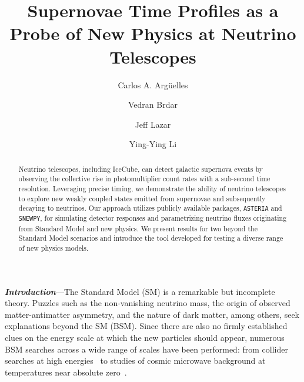 \documentclass[aps,twocolumn,prl,showpacs,showkeys,preprintnumbers,superscriptaddress,nobibnotes,floatfix,longbibliography,notitlepage,nofootinbib]{revtex4-2}
\begin{document}

\title{
Supernovae Time Profiles as a Probe of New Physics at Neutrino Telescopes
}

\author{Carlos A. Arg\"{u}elles}
\author{Vedran Brdar}
\author{Jeff Lazar}
\author{Ying-Ying Li}


\begin{abstract}
Neutrino telescopes, including IceCube, can detect galactic supernova events by observing the collective rise in photomultiplier count rates with a sub-second time resolution. 
Leveraging precise timing, we demonstrate the ability of neutrino telescopes to explore new weakly coupled states emitted from supernovae and subsequently decaying to neutrinos.
Our approach utilizes publicly available packages, \texttt{ASTERIA} and \texttt{SNEWPY}, for simulating detector responses and parametrizing neutrino fluxes originating from Standard Model and new physics. 
We present results for two beyond the Standard Model scenarios and introduce the tool developed for testing a diverse range of new physics models.
\end{abstract}

\maketitle

\textbf{\textit{Introduction}}---The Standard Model (SM) is a remarkable but incomplete theory. 
Puzzles such as the non-vanishing neutrino mass, the origin of observed matter-antimatter asymmetry, and the nature of dark matter, among others, seek explanations beyond the SM (BSM).
Since there are also no firmly established clues on the energy scale at which the new particles should appear, numerous BSM searches across a wide range of scales have been performed: from collider searches at high energies~\cite{Nath:2010zj} to studies of cosmic microwave background at temperatures near absolute zero~\cite{Baumann:2015rya}.
\end{document}
